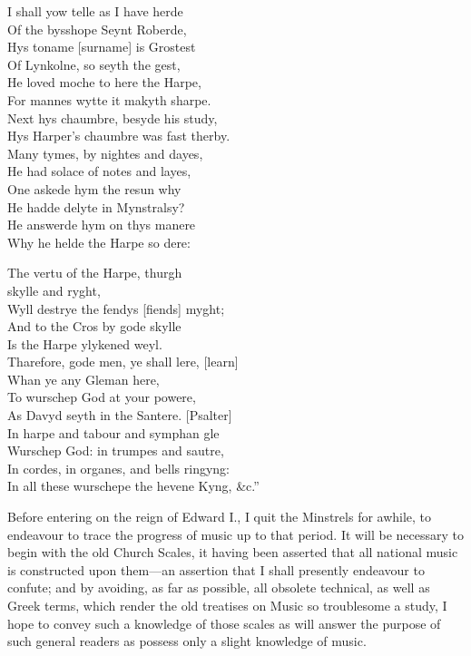 \begin{dcverse}I shall yow telle as I have herde\\
Of the bysshope Seynt Roberde,\\
Hys toname [surname] is Grostest\\
Of Lynkolne, so seyth the gest,\\
He loved moche to here the Harpe,\\
For mannes wytte it makyth sharpe.\\
Next hys chaumbre, besyde his study,\\
Hys Harper’s chaumbre was fast therby.\\
Many tymes, by nightes and dayes,\\
He had solace of notes and layes,\\
One askede hym the resun why\\
He hadde delyte in Mynstralsy?\\
He answerde hym on thys manere\\
Why he helde the Harpe so dere:\\
\columnbreak

The vertu of the Harpe, thurgh\\
\vin\vin\vin [through] skylle and ryght,\\
Wyll destrye the fendys [fiends] myght;\\
And to the Cros by gode skylle\\
Is the Harpe ylykened weyl.\\
Tharefore, gode men, ye shall lere, [learn]\\
Whan ye any Gleman here,\\
To wurschep God at your powere,\\
As Davyd seyth in the Santere. [Psalter]\\
In harpe and tabour and symphan gle\\
Wurschep God: in trumpes and sautre,\\
In cordes, in organes, and bells ringyng:\\
In all these wurschepe the hevene Kyng, \&c.”
\end{dcverse}\normalsize


Before entering on the reign of Edward I., I quit the Minstrels for awhile, to
endeavour to trace the progress of music up to that period. It will be necessary
to begin with the old Church Scales, it having been asserted that all national
music is constructed upon them—an assertion that I shall presently endeavour
to confute; and by avoiding, as far as possible, all obsolete technical, as well
as Greek terms, which render the old treatises on Music so troublesome a study,
I hope to convey such a knowledge of those scales as will answer the purpose of
such general readers as possess only a slight knowledge of music.

